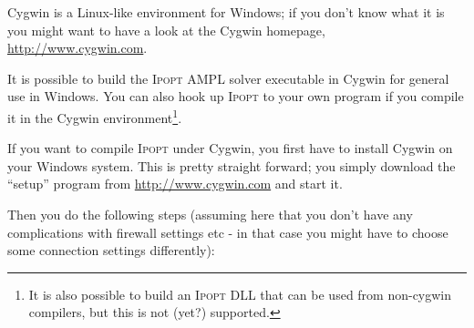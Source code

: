 \documentclass[10pt]{article}
\newcommand{\Ipopt}{\textsc{Ipopt}\xspace}
\begin{document}
Cygwin is a Linux-like environment for Windows; if you don't know what
it is you might want to have a look at the Cygwin homepage,
\url{http://www.cygwin.com}.

It is possible to build the \Ipopt AMPL solver executable in Cygwin
for general use in Windows.  You can also hook up \Ipopt to your own
program if you compile it in the Cygwin environment\footnote{It is
  also possible to build an \Ipopt DLL that can be used from
  non-cygwin compilers, but this is not (yet?) supported.}.

If you want to compile \Ipopt under Cygwin, you first have to install
Cygwin on your Windows system.  This is pretty straight forward; you
simply download the ``setup'' program from
\url{http://www.cygwin.com} and start it.

Then you do the following steps (assuming here that you don't have any
complications with firewall settings etc - in that case you might have
to choose some connection settings differently):
\end{document}
